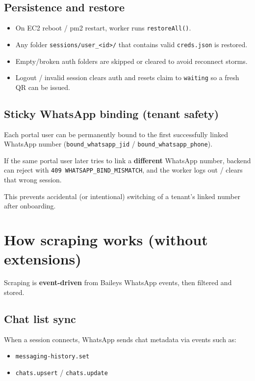 \documentclass[11pt,a4paper]{article}
\begin{document}
\subsection{Persistence and restore}

\begin{itemize}[leftmargin=1.2em]
  \item On EC2 reboot / pm2 restart, worker runs \texttt{restoreAll()}.
  \item Any folder \texttt{sessions/user\_<id>/} that contains valid \texttt{creds.json} is restored.
  \item Empty/broken auth folders are skipped or cleared to avoid reconnect storms.
  \item Logout / invalid session clears auth and resets claim to \texttt{waiting} so a fresh QR can be issued.
\end{itemize}

\subsection{Sticky WhatsApp binding (tenant safety)}

Each portal user can be permanently bound to the first successfully linked WhatsApp number (\texttt{bound\_whatsapp\_jid} / \texttt{bound\_whatsapp\_phone}).

If the same portal user later tries to link a \textbf{different} WhatsApp number, backend can reject with \texttt{409 WHATSAPP\_BIND\_MISMATCH}, and the worker logs out / clears that wrong session.

This prevents accidental (or intentional) switching of a tenant's linked number after onboarding.

\section{How scraping works (without extensions)}

Scraping is \textbf{event-driven} from Baileys WhatsApp events, then filtered and stored.

\subsection{Chat list sync}

When a session connects, WhatsApp sends chat metadata via events such as:
\begin{itemize}[leftmargin=1.2em]
  \item \texttt{messaging-history.set}
  \item \texttt{chats.upsert} / \texttt{chats.update}
\end{itemize}
\end{document}
